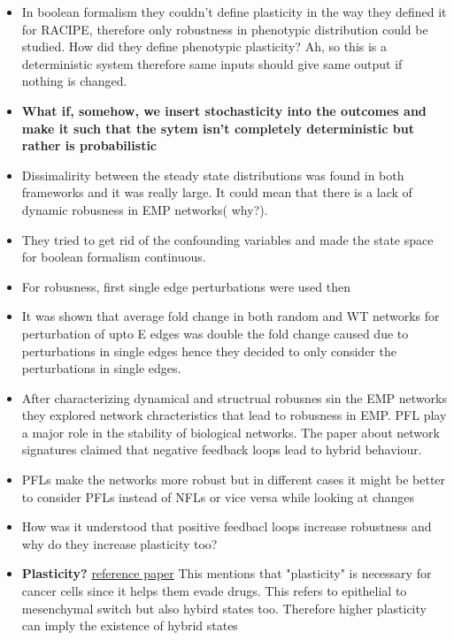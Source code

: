\documentclass{article}
\begin{document}
\begin{itemize}
\item In boolean formalism they couldn't define plasticity in the way they defined it for RACIPE, therefore only robustness in phenotypic distribution could be studied. How did they define phenotypic plasticity? Ah, so this is a deterministic system therefore same inputs should give same output if nothing is changed. 


\item \textbf{ What if, somehow, we insert stochasticity into the outcomes and make it such that the sytem isn't completely deterministic but rather is probabilistic }


\item Dissimalirity between the steady state distributions was found in both frameworks and it was really large. It could mean that there is a lack of dynamic robusness in EMP networks( why?). 

\item They tried to get rid of the confounding variables and made the state space for boolean formalism continuous. 


\item For robusness, first single edge perturbations were used then 

\item It was shown that average fold change in both random and WT networks for perturbation of upto E edges was double the fold change caused due to perturbations in single edges hence they decided to only consider the perturbations in single edges. 

\item After characterizing dynamical and structrual robusnes sin the EMP networks they explored network chracteristics that lead to robusness in EMP. PFL play a major role in the stability of biological networks. The paper about network signatures claimed that negative feedback loops lead to hybrid behaviour. 

\item PFLs make the networks more robust but in different cases it might be better to consider PFLs instead of NFLs or vice versa while looking at changes 

\item How was it understood that positive feedbacl loops increase robustness and why do they increase plasticity too? 

\item \textbf{Plasticity?   } \href{https://www.nature.com/articles/s41540-020-0132-1}{reference paper} This mentions that "plasticity" is necessary for cancer cells since it helps them evade drugs. This refers to epithelial to mesenchymal switch but also hybird states too. Therefore higher plasticity can imply the existence of hybrid states


\end{itemize}
\end{document}
